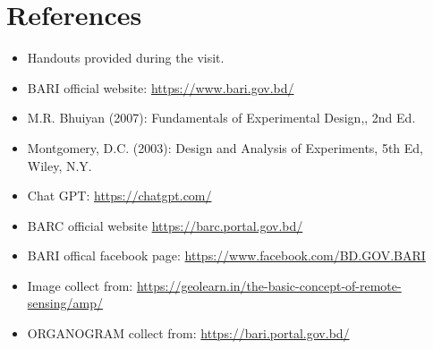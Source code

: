 \documentclass[oneside,12pt,fleqn]{book}
\begin{document}
\chapter*{References}
\begin{itemize}
    \item Handouts provided during the visit.
    \item BARI official website: \url{https://www.bari.gov.bd/}
    \item M.R. Bhuiyan (2007): Fundamentals of Experimental Design,, 2nd Ed.
    \item Montgomery, D.C. (2003): Design and Analysis of Experiments, 5th Ed, Wiley, N.Y.
    \item Chat GPT:
    \url{https://chatgpt.com/}
    \item BARC official website
    \url{https://barc.portal.gov.bd/}
    \item BARI offical facebook page:
    \url{https://www.facebook.com/BD.GOV.BARI}
    \item Image collect from:
    \url{https://geolearn.in/the-basic-concept-of-remote-sensing/amp/}
    \item ORGANOGRAM collect from:
    \url{https://bari.portal.gov.bd/}
\end{itemize}
\end{document}
